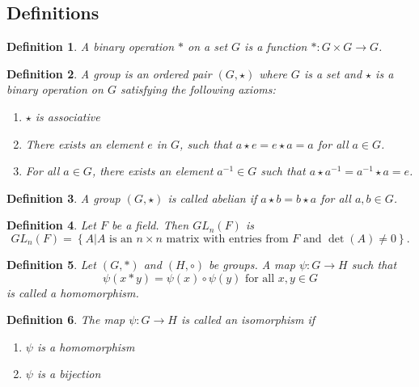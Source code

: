 \documentclass[12pt]{article}
\newtheorem*{definition}{Definition}
\begin{document}
\subsection{Definitions}

\begin{definition}
  A binary operation $*$ on a set $G$ is a function $*: G \times G \to G$. \\
\end{definition}

\begin{definition}
  A group is an ordered pair $(G, \star)$ where $G$ is a set and $\star$ is a binary operation on $G$ satisfying the following axioms:

  \begin{enumerate}
    \item $\star$ is associative
    \item There exists an element $e$ in $G$, such that $a \star e = e \star a = a$ for all $a\in G$.
    \item For all $a \in G$, there exists an element $a^{-1} \in G$ such that $a \star a^{-1} = a^{-1} \star a = e$. \\
  \end{enumerate}
\end{definition}

\begin{definition}
  A group $(G, \star)$ is called abelian if $a \star b = b \star a$ for all $a, b \in G$. \\
\end{definition}

\begin{definition}
  Let $F$ be a field.  Then $GL_n(F)$ is
  \[
    GL_n(F) = \left\{ A | A \text{ is an } n \times n \text{ matrix with entries from } F \text{ and } \det(A) \neq 0 \right\}.
  \]
\end{definition}

\begin{definition}
  Let $(G, *)$ and $(H, \circ)$ be groups.  A map $\psi: G \to H$ such that
  \[
    \psi(x * y) = \psi(x) \circ \psi(y) \text{ for all $x, y \in G$}
  \]
  is called a homomorphism. \\
\end{definition}

\begin{definition}
  The map $\psi: G \to H$ is called an isomorphism if
  \begin{enumerate}
    \item $\psi$ is a homomorphism
    \item $\psi$ is a bijection \\
  \end{enumerate}
\end{definition}
\end{document}
